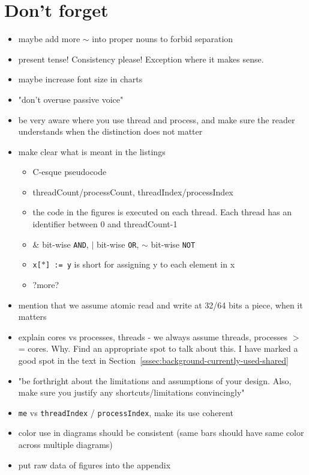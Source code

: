 \documentclass[a4paper, 10pt]{article}
\begin{document}
\section{Don't forget}
\begin{itemize}
	\item maybe add more $\sim$ into proper nouns to forbid separation
	\item present tense! Consistency please! Exception where it makes sense.
	\item maybe increase font size in charts
	\item "don't overuse passive voice"
	\item be very aware where you use thread and process, and make sure the reader understands when the distinction does not matter
	\item make clear what is meant in the listings
		\begin{itemize}
			\item C-esque pseudocode
			\item threadCount/processCount,  threadIndex/processIndex
			\item the code in the figures is executed on each thread. Each thread has an identifier between 0 and threadCount-1
			\item \& bit-wise \texttt{AND}, $|$ bit-wise \texttt{OR}, $\sim$ bit-wise \texttt{NOT}
			\item \texttt{x[$*$] := y} is short for assigning y to each element in x
			\item ?more?
		\end{itemize}
	\item mention that we assume atomic read and write at 32/64 bits a piece, when it matters
	\item explain cores vs processes, threads - we always assume threads, processes $>$= cores. Why. Find an appropriate spot to talk about this. I have marked a good spot in the text in Section~\ref{sssec:background-currently-used-shared}
	\item "be forthright about the limitations and assumptions of your design. Also, make sure you justify any shortcuts/limitations convincingly"
	\item \texttt{me} vs \texttt{threadIndex} / \texttt{processIndex}, make its use coherent
	\item color use in diagrams should be consistent (same bars should have same color across multiple diagrams)
	\item put raw data of figures into the appendix
\end{itemize}
\end{document}
